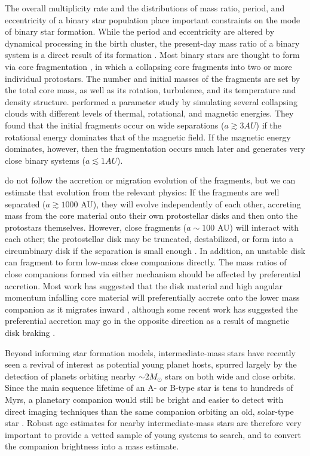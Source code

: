 \documentclass{utthesis}
\begin{document}
The overall multiplicity rate and the distributions of mass ratio, period, and eccentricity of a binary star population place important constraints on the mode of binary star formation. While the period and eccentricity are altered by dynamical processing in the birth cluster, the present-day mass ratio of a binary system is a direct result of its formation \citep{Parker2013}. Most binary stars are thought to form via core fragmentation \citep{Boss1979, Boss1986, Bate1995}, in which a collapsing core fragments into two or more individual protostars. The number and initial masses of the fragments are set by the total core mass, as well as its rotation, turbulence, and its temperature and density structure. \citet{Machida2008} performed a parameter study by simulating several collapsing clouds with different levels of thermal, rotational, and magnetic energies. They found that the initial fragments occur on wide separations ($a \gtrsim 3 AU$) if the rotational energy dominates that of the magnetic field. If the magnetic energy dominates, however, then the fragmentation occurs much later and generates very close binary systems ($a \lesssim 1 AU$). 

\citet{Machida2008} do not follow the accretion or migration evolution of the fragments, but we can estimate that evolution from the relevant physics: If the fragments are well separated ($a \gtrsim 1000$ AU), they will evolve independently of each other, accreting mass from the core material onto their own protostellar disks and then onto the protostars themselves.  However, close fragments ($a \sim 100$ AU) will interact with each other; the protostellar disk may be truncated, destabilized, or form into a circumbinary disk if the separation is small enough \citep{Bate1997}. In addition, an unstable disk can fragment to form low-mass close companions \citep{Kratter2006, Stamatellos2011} directly. The mass ratios of close companions formed via either mechanism should be affected by preferential accretion. Most work has suggested that the disk material and high angular momentum infalling core material will preferentially accrete onto the lower mass companion as it migrates inward \citep{Bate1997, BBB2002}, although some recent work has suggested the preferential accretion may go in the opposite direction as a result of magnetic disk braking \citep{Zhao2013}.

Beyond informing star formation models, intermediate-mass stars have recently seen a revival of interest as potential young planet hosts, spurred largely by the detection of planets orbiting nearby \mbox{$\sim2 M_{\odot}$} stars on both wide \citep[e.g.][]{Lagrange2010, Marois2008} and close \citep{Johnson2011} orbits. Since the main sequence lifetime of an A- or B-type star is tens to hundreds of Myrs, a planetary companion would still be bright and easier to detect with direct imaging techniques than the same companion orbiting an old, solar-type star \citep{Marley2007}. Robust age estimates for nearby intermediate-mass stars are therefore very important to provide a vetted sample of young systems to search, and to convert the companion brightness into a mass estimate. 
\end{document}
